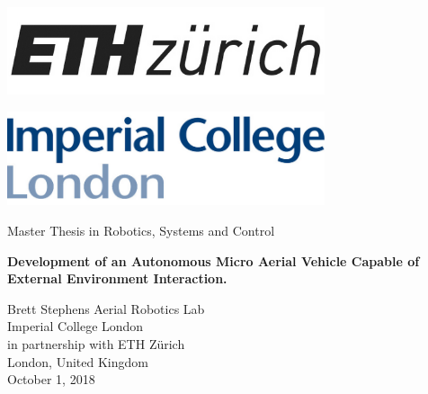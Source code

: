 \begin{titlepage}

    \begin{minipage}{.45\linewidth}
        \begin{flushleft}
            \includegraphics[width=0.7\textwidth]{images/ETHZurichLogo.png}
        \end{flushleft}
        
    \end{minipage}
    \hfill
    \begin{minipage}{.45\linewidth}
        \begin{flushright}
            \includegraphics[width=0.7\textwidth]{images/ImperialLogo.png}
        \end{flushright}
    \end{minipage}
    
    \begin{center}
        \vspace*{2cm}
        \large
        Master Thesis in Robotics, Systems and Control
        \vspace*{1cm}
    \end{center}
    
    \begin{center}
    
        \vspace{1cm}
        \Large
        \textbf{Development of an Autonomous Micro Aerial Vehicle Capable of External Environment Interaction.} 
        
        \vspace{1.5cm}
        Brett Stephens
        \vfill
        \vspace{0.8cm}
        \Large
        Aerial Robotics Lab\\
        Imperial College London\\
        in partnership with ETH Z{\"u}rich\\
        \vspace{0.8cm}
        London, United Kingdom\\
        October 1, 2018
        
    \end{center}
\end{titlepage}
